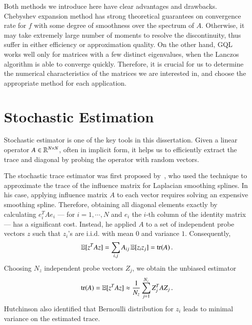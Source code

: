 Both methods we introduce here have clear advantages and drawbacks. Chebyshev
expansion method has strong theoretical guarantees on convergence rate for $f$
with some degree of smoothness over the spectrum of $A$. Otherwise, it may take
extremely large number of moments to resolve the discontinuity, thus suffer in
either efficiency or approximation quality. On the other hand, GQL works well
only for matrices with a few distinct eigenvalues, when the Lanczos algorithm is
able to converge quickly. Therefore, it is crucial for us to determine the
numerical characteristics of the matrices we are interested in, and choose the
appropriate method for each application.

\section{Stochastic Estimation}\label{pre:ste}

Stochastic estimator is one of the key tools in this dissertation. Given a
linear operator $A\in\mathbb{R}^{N\mathbin{\times} N}$, often in implicit form, it helps us to
efficiently extract the trace and diagonal by probing the operator with random
vectors. 

The stochastic trace estimator was first proposed by~\citet{
hutchinson1990stochastic}, who used the technique to approximate the
trace of the influence matrix for Laplacian
smoothing splines. In his case, applying influence matrix $A$ to each vector
requires solving an expensive smoothing spline. Therefore, obtaining all
diagonal elements exactly by calculating $e_i^TAe_i$ --- for $i=1,\cdots, N$ and
$e_i$ the $i$\hyp{}th column of the identity matrix --- has a significant cost.
Instead, he applied $A$ to a set of independent probe vectors $z$ such that
$z_i$'s are i.i.d. with mean $0$ and variance $1$. Consequently, 
\begin{equation}\label{eq:probe_trace}
	\operatorname{\mathbb{E}}[z^TAz] = \sum_{i,j}A_{ij}\operatorname{\mathbb{E}}[z_iz_j] = \operatorname{tr}(A)\,.
\end{equation}
Choosing $N_z$ independent probe vectors $Z_j$, we obtain the unbiased estimator
\begin{equation}\label{eqn:trace_est}
	\operatorname{tr}(A) = \operatorname{\mathbb{E}}[z^TAz] \approx \frac{1}{N_z}\sum_{j=1}^{N_z}Z_j^TAZ_j\,.
\end{equation}
Hutchinson also identified that Bernoulli distribution for $z_i$ leads to
minimal variance on the estimated trace.

